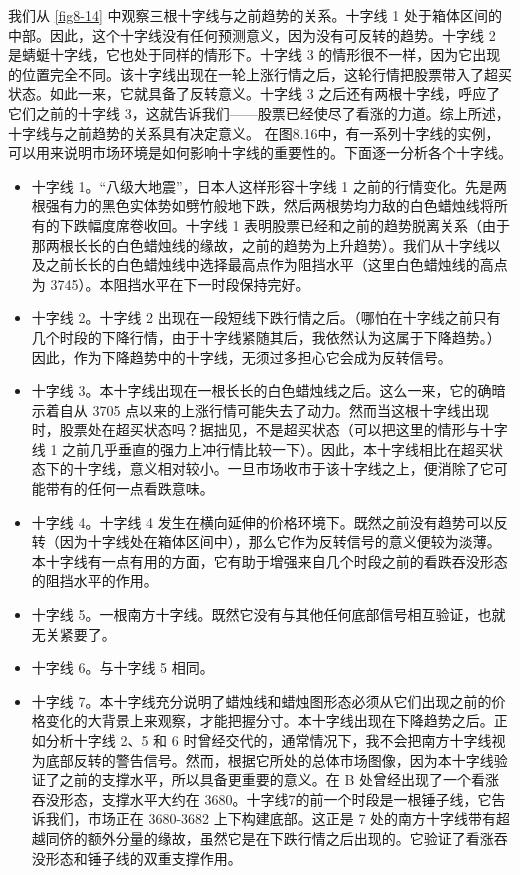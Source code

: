 我们从 \autoref{fig8-14} 中观察三根十字线与之前趋势的关系。十字线 1 处于箱体区间的中部。因此，这个十字线没有任何预测意义，因为没有可反转的趋势。十字线 2 是蜻蜓十字线，它也处于同样的情形下。十字线 3 的情形很不一样，因为它出现的位置完全不同。该十字线出现在一轮上涨行情之后，这轮行情把股票带入了超买状态。如此一来，它就具备了反转意义。十字线 3 之后还有两根十字线，呼应了它们之前的十字线 3，这就告诉我们——股票已经使尽了看涨的力道。综上所述，十字线与之前趋势的关系具有决定意义。
在图8.16中，有一系列十字线的实例，可以用来说明市场环境是如何影响十字线的重要性的。下面逐一分析各个十字线。
\begin{itemize}
    \item 十字线 1。“八级大地震”，日本人这样形容十字线 1 之前的行情变化。先是两根强有力的黑色实体势如劈竹般地下跌，然后两根势均力敌的白色蜡烛线将所有的下跌幅度席卷收回。十字线 1 表明股票已经和之前的趋势脱离关系（由于那两根长长的白色蜡烛线的缘故，之前的趋势为上升趋势）。我们从十字线以及之前长长的白色蜡烛线中选择最高点作为阻挡水平（这里白色蜡烛线的高点为 3745）。本阻挡水平在下一时段保持完好。
    \item 十字线 2。十字线 2 出现在一段短线下跌行情之后。（哪怕在十字线之前只有几个时段的下降行情，由于十字线紧随其后，我依然认为这属于下降趋势。）因此，作为下降趋势中的十字线，无须过多担心它会成为反转信号。
    \item 十字线 3。本十字线出现在一根长长的白色蜡烛线之后。这么一来，它的确暗示着自从 3705 点以来的上涨行情可能失去了动力。然而当这根十字线出现时，股票处在超买状态吗？据拙见，不是超买状态（可以把这里的情形与十字线 1 之前几乎垂直的强力上冲行情比较一下）。因此，本十字线相比在超买状态下的十字线，意义相对较小。一旦市场收市于该十字线之上，便消除了它可能带有的任何一点看跌意味。
    \item 十字线 4。十字线 4 发生在横向延伸的价格环境下。既然之前没有趋势可以反转（因为十字线处在箱体区间中），那么它作为反转信号的意义便较为淡薄。本十字线有一点有用的方面，它有助于增强来自几个时段之前的看跌吞没形态的阻挡水平的作用。
    \item 十字线 5。一根南方十字线。既然它没有与其他任何底部信号相互验证，也就无关紧要了。
    \item 十字线 6。与十字线 5 相同。
    \item 十字线 7。本十字线充分说明了蜡烛线和蜡烛图形态必须从它们出现之前的价格变化的大背景上来观察，才能把握分寸。本十字线出现在下降趋势之后。正如分析十字线 2、5 和 6 时曾经交代的，通常情况下，我不会把南方十字线视为底部反转的警告信号。然而，根据它所处的总体市场图像，因为本十字线验证了之前的支撑水平，所以具备更重要的意义。在 B 处曾经出现了一个看涨吞没形态，支撑水平大约在 3680。十字线7的前一个时段是一根锤子线，它告诉我们，市场正在 3680-3682 上下构建底部。这正是 7 处的南方十字线带有超越同侪的额外分量的缘故，虽然它是在下跌行情之后出现的。它验证了看涨吞没形态和锤子线的双重支撑作用。
\end{itemize}

